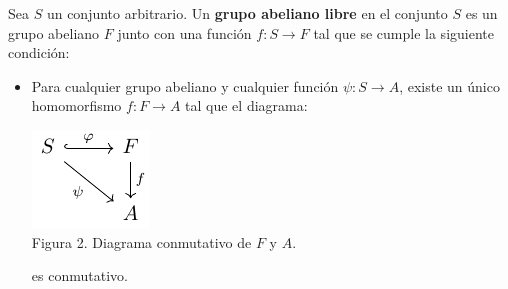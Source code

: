 \documentclass[12pt]{report}
\theoremstyle{largebreak}
\newcommand\cf[3]{\ensuremath{#1:#2\rightarrow#3}}
\begin{document}
    \begin{mydef}
        Sea $S$ un conjunto arbitrario. Un \textbf{grupo abeliano libre} en el conjunto $S$ es un grupo abeliano $F$ junto con una función $\cf{f}{S}{F}$ tal que se cumple la siguiente condición:
        \begin{itemize}
            \item Para cualquier grupo abeliano y cualquier función $\cf{\psi}{S}{A}$, existe un único homomorfismo $\cf{f}{F}{A}$ tal que el diagrama:
            
            \begin{minipage}{\textwidth}
                \begin{center}
                    \includegraphics[scale=1.5]{images/fig_2.pdf}\\
                    Figura 2. Diagrama conmutativo de $F$ y $A$.
                \end{center}
            \end{minipage}
            
            es conmutativo.
        \end{itemize}
    \end{mydef}

\end{document}
